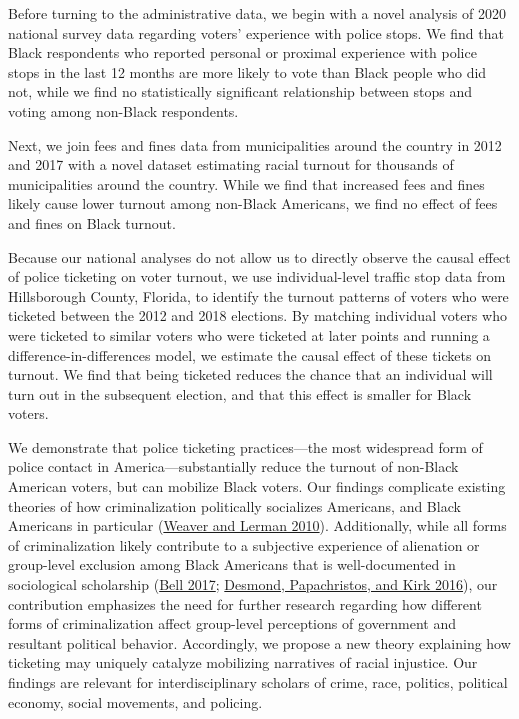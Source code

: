 \documentclass[
  12pt,
]{article}
\begin{document}
Before turning to the administrative data, we begin with a novel analysis of 2020 national survey data regarding voters' experience with police stops. We find that Black respondents who reported personal or proximal experience with police stops in the last 12 months are more likely to vote than Black people who did not, while we find no statistically significant relationship between stops and voting among non-Black respondents.

Next, we join fees and fines data from municipalities around the country in 2012 and 2017 with a novel dataset estimating racial turnout for thousands of municipalities around the country. While we find that increased fees and fines likely cause lower turnout among non-Black Americans, we find no effect of fees and fines on Black turnout.

Because our national analyses do not allow us to directly observe the causal effect of police ticketing on voter turnout, we use individual-level traffic stop data from Hillsborough County, Florida, to identify the turnout patterns of voters who were ticketed between the 2012 and 2018 elections. By matching individual voters who were ticketed to similar voters who were ticketed at later points and running a difference-in-differences model, we estimate the causal effect of these tickets on turnout. We find that being ticketed reduces the chance that an individual will turn out in the subsequent election, and that this effect is smaller for Black voters.

We demonstrate that police ticketing practices---the most widespread form of police contact in America---substantially reduce the turnout of non-Black American voters, but can mobilize Black voters. Our findings complicate existing theories of how criminalization politically socializes Americans, and Black Americans in particular (\protect\hyperlink{ref-Weaver2010}{Weaver and Lerman 2010}). Additionally, while all forms of criminalization likely contribute to a subjective experience of alienation or group-level exclusion among Black Americans that is well-documented in sociological scholarship (\protect\hyperlink{ref-Bell2017}{Bell 2017}; \protect\hyperlink{ref-Desmond2016}{Desmond, Papachristos, and Kirk 2016}), our contribution emphasizes the need for further research regarding how different forms of criminalization affect group-level perceptions of government and resultant political behavior. Accordingly, we propose a new theory explaining how ticketing may uniquely catalyze mobilizing narratives of racial injustice. Our findings are relevant for interdisciplinary scholars of crime, race, politics, political economy, social movements, and policing.
\end{document}
